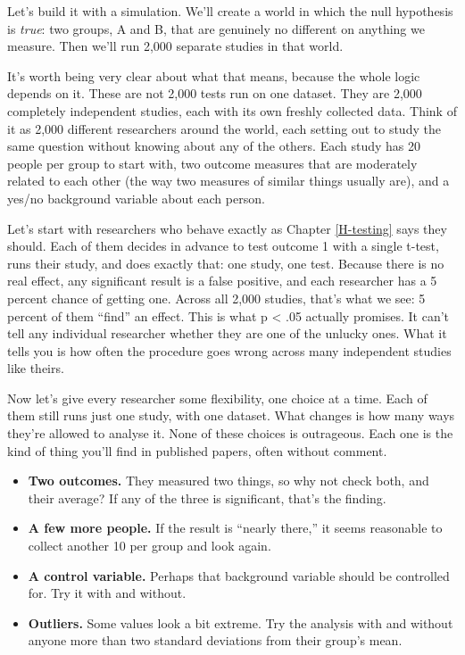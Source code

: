 \documentclass[
]{book}
\providecommand{\tightlist}{%
  \setlength{\itemsep}{0pt}\setlength{\parskip}{0pt}}
\begin{document}
Let's build it with a simulation. We'll create a world in which the null hypothesis is \emph{true}: two groups, A and B, that are genuinely no different on anything we measure. Then we'll run 2,000 separate studies in that world.

It's worth being very clear about what that means, because the whole logic depends on it. These are not 2,000 tests run on one dataset. They are 2,000 completely independent studies, each with its own freshly collected data. Think of it as 2,000 different researchers around the world, each setting out to study the same question without knowing about any of the others. Each study has 20 people per group to start with, two outcome measures that are moderately related to each other (the way two measures of similar things usually are), and a yes/no background variable about each person.

Let's start with researchers who behave exactly as Chapter \ref{H-testing} says they should. Each of them decides in advance to test outcome 1 with a single t-test, runs their study, and does exactly that: one study, one test. Because there is no real effect, any significant result is a false positive, and each researcher has a 5 percent chance of getting one. Across all 2,000 studies, that's what we see: 5 percent of them ``find'' an effect. This is what p \textless{} .05 actually promises. It can't tell any individual researcher whether they are one of the unlucky ones. What it tells you is how often the procedure goes wrong across many independent studies like theirs.

Now let's give every researcher some flexibility, one choice at a time. Each of them still runs just one study, with one dataset. What changes is how many ways they're allowed to analyse it. None of these choices is outrageous. Each one is the kind of thing you'll find in published papers, often without comment.

\begin{itemize}
\tightlist
\item
  \textbf{Two outcomes.} They measured two things, so why not check both, and their average? If any of the three is significant, that's the finding.
\item
  \textbf{A few more people.} If the result is ``nearly there,'' it seems reasonable to collect another 10 per group and look again.
\item
  \textbf{A control variable.} Perhaps that background variable should be controlled for. Try it with and without.
\item
  \textbf{Outliers.} Some values look a bit extreme. Try the analysis with and without anyone more than two standard deviations from their group's mean.
\end{itemize}
\end{document}
